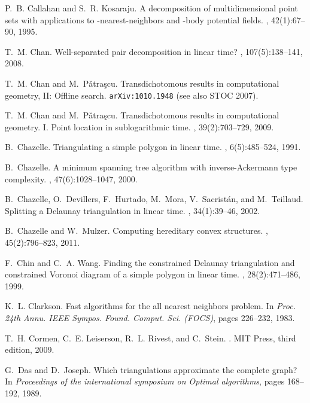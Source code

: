 \documentclass[11pt]{paper}
\begin{document}
\begin{thebibliography}{10}
P.~B. Callahan and S.~R. Kosaraju.
\newblock A decomposition of multidimensional point sets with applications to
  {}-nearest-neighbors and {}-body potential fields.
, 42(1):67--90, 1995.

T.~M. Chan.
\newblock Well-separated pair decomposition in linear time?
, 107(5):138--141, 2008.

T.~M. Chan and M.~P{\v a}tra{\c s}cu.
\newblock Transdichotomous results in computational geometry, {II}: {O}ffline
  search.
\newblock \texttt{arXiv:1010.1948} (see also STOC 2007).

T.~M. Chan and M.~P{\v{a}}tra{\c{s}}cu.
\newblock Transdichotomous results in computational geometry. {I}. {P}oint
  location in sublogarithmic time.
, 39(2):703--729, 2009.

B.~Chazelle.
\newblock Triangulating a simple polygon in linear time.
, 6(5):485--524, 1991.

B.~Chazelle.
\newblock A minimum spanning tree algorithm with inverse-{A}ckermann type
  complexity.
, 47(6):1028--1047, 2000.

B.~Chazelle, O.~Devillers, F.~Hurtado, M.~Mora, V.~Sacrist{\'a}n, and
  M.~Teillaud.
\newblock Splitting a {D}elaunay triangulation in linear time.
, 34(1):39--46, 2002.

B.~Chazelle and W.~Mulzer.
\newblock Computing hereditary convex structures.
, 45(2):796--823, 2011.

F.~Chin and C.~A. Wang.
\newblock Finding the constrained {D}elaunay triangulation and constrained
  {V}oronoi diagram of a simple polygon in linear time.
, 28(2):471--486, 1999.

K.~L. Clarkson.
\newblock Fast algorithms for the all nearest neighbors problem.
\newblock In {\em Proc. 24th Annu. IEEE Sympos. Found. Comput. Sci. (FOCS)},
  pages 226--232, 1983.

T.~H. Cormen, C.~E. Leiserson, R.~L. Rivest, and C.~Stein.
.
\newblock MIT Press, third edition, 2009.

G.~Das and D.~Joseph.
\newblock Which triangulations approximate the complete graph?
\newblock In {\em Proceedings of the international symposium on Optimal
  algorithms}, pages 168--192, 1989.


\end{thebibliography}
\end{document}
